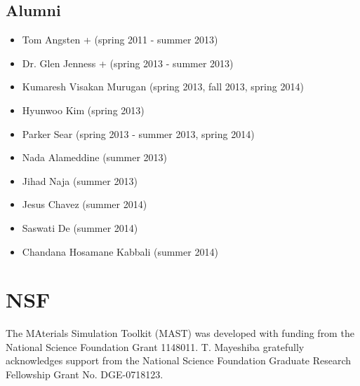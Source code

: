\documentclass[letterpaper,10pt,english]{sphinxmanual}
\begin{document}
\subsection{Alumni}
\label{10_0_acknowledgments:alumni}\begin{itemize}
\item {} 
Tom Angsten + (spring 2011 - summer 2013)

\item {} 
Dr. Glen Jenness + (spring 2013 - summer 2013)

\item {} 
Kumaresh Visakan Murugan (spring 2013, fall 2013, spring 2014)

\item {} 
Hyunwoo Kim (spring 2013)

\item {} 
Parker Sear (spring 2013 - summer 2013, spring 2014)

\item {} 
Nada Alameddine (summer 2013)

\item {} 
Jihad Naja (summer 2013)

\item {} 
Jesus Chavez (summer 2014)

\item {} 
Saswati De (summer 2014)

\item {} 
Chandana Hosamane Kabbali (summer 2014)

\end{itemize}


\section{NSF}
\label{10_0_acknowledgments:nsf}

The MAterials Simulation Toolkit (MAST) was developed with funding from the National Science Foundation Grant 1148011. T. Mayeshiba gratefully acknowledges support from the National Science Foundation Graduate Research Fellowship Grant No. DGE-0718123.
\end{document}
